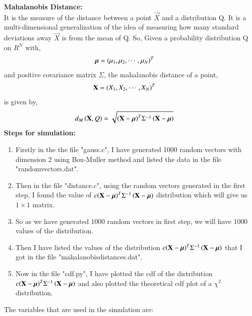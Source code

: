 \documentclass[journal,12pt,onecolumn]{IEEEtran}
\theoremstyle{remark}
\begin{document}
\textbf{Mahalanobis Distance:} \\
It is the measure of the distance between a point $\vec{X}$ and a distribution Q. It is a multi-dimensional generalization of the idea of measuring how many standard deviations away $\vec{X}$ is from the mean of Q. So, Given a probability distribution Q on $R^N$ with,
\begin{align}
\bm{\mu} &= {\left({\mu}_1,{\mu}_2,\cdots,{\mu}_N\right)}^T 
\end{align}
and positive covariance matrix $\Sigma$, the mahalanobis distance of a point,
\begin{align}
\mathbf{X} &= {\left(X_1,X_2,\cdots,X_N\right)}^T 
\end{align}
is given by,
\begin{align}
d_M\left(\mathbf{X},Q\right) &= \sqrt{{\left(\mathbf{X}-\bm{\mu}\right)}^T{\Sigma}^{-1}\left(\mathbf{X}-\bm{\mu}\right)}
\end{align}
\textbf{Steps for simulation:}
\begin{enumerate}
\item Firstly in the the file "gauss.c", I have generated 1000 random vectors with dimension 2 using Box-Muller method and listed the data in the file "randomvectors.dat".
\item Then in the file "distance.c", using the random vectors generated in the first step, I found the value of $c{\left(\mathbf{X}-\bm{\mu}\right)}^T{\Sigma}^{-1}\left(\mathbf{X}-\bm{\mu}\right)$ distribution which will give us $1 \times 1$ matrix.
\item So as we have generated 1000 random vectors in first step, we will have 1000 values of the distribution.
\item Then I have listed the values of the distribution $c{\left(\mathbf{X}-\bm{\mu}\right)}^T{\Sigma}^{-1}\left(\mathbf{X}-\bm{\mu}\right)$ that I got in the file "mahalanobisdistances.dat".
\item Now in the file "cdf.py", I have plotted the cdf of the distribution $c{\left(\mathbf{X}-\bm{\mu}\right)}^T{\Sigma}^{-1}\left(\mathbf{X}-\bm{\mu}\right)$ and also plotted the theoretical cdf plot of a ${\chi}^2$ distribution.
\end{enumerate}
The variables that are used in the simulation are:
\begin{table}[!ht]

\end{table}
\end{document}
